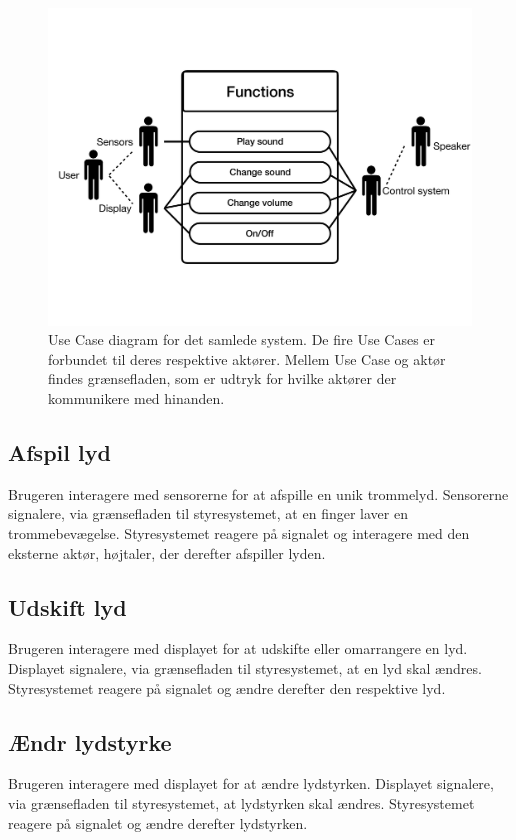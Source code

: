 \begin{figure}
\centering
\includegraphics[scale=0.4]{Figure/protoUseCase01.pdf}
\caption{
Use Case diagram for det samlede system. De fire Use Cases er forbundet til deres respektive aktører. Mellem Use Case og aktør findes grænsefladen, som er udtryk for hvilke aktører der kommunikere med hinanden.}
\label{fig:protoUseCase01.pdf}
\end{figure}

\subsection{Afspil lyd}
Brugeren interagere med sensorerne for at afspille en unik trommelyd. Sensorerne signalere, via grænsefladen til styresystemet, at en finger laver en trommebevægelse. Styresystemet reagere på signalet og interagere med den eksterne aktør, højtaler, der derefter afspiller lyden.    

\subsection{Udskift lyd}
Brugeren interagere med displayet for at udskifte eller omarrangere en lyd. Displayet signalere, via grænsefladen til styresystemet, at en lyd skal ændres. Styresystemet reagere på signalet og ændre derefter den respektive lyd.   

\subsection{Ændr lydstyrke}
Brugeren interagere med displayet for at ændre lydstyrken. Displayet signalere, via grænsefladen til styresystemet, at lydstyrken skal ændres. Styresystemet reagere på signalet og ændre derefter lydstyrken. 


